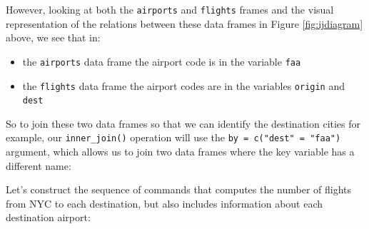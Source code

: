 \documentclass[12pt, krantz2,]{krantz}
\makeatletter
\newenvironment{Shaded}{\begin{snugshade}}{\end{snugshade}}
\newcommand{\DataTypeTok}[1]{\textcolor[rgb]{0.27,0.27,0.27}{#1}}
\newcommand{\KeywordTok}[1]{\textcolor[rgb]{0.27,0.27,0.27}{\textbf{#1}}}
\newcommand{\NormalTok}[1]{#1}
\newcommand{\OperatorTok}[1]{\textcolor[rgb]{0.43,0.43,0.43}{\textbf{#1}}}
\newcommand{\StringTok}[1]{\textcolor[rgb]{0.5,0.5,0.5}{#1}}
\providecommand{\tightlist}{%
  \setlength{\itemsep}{0pt}\setlength{\parskip}{0pt}}
\newenvironment{kframe}{%
\medskip{}
\setlength{\fboxsep}{.8em}
 \def\at@end@of@kframe{}%
 \ifinner\ifhmode%
  \def\at@end@of@kframe{\end{minipage}}%
  \begin{minipage}{\columnwidth}%
 \fi\fi%
 \def\FrameCommand##1{\hskip\@totalleftmargin \hskip-\fboxsep
 \colorbox{shadecolor}{##1}\hskip-\fboxsep
     \hskip-\linewidth \hskip-\@totalleftmargin \hskip\columnwidth}%
 \MakeFramed {\advance\hsize-\width
   \@totalleftmargin\z@ \linewidth\hsize
   \@setminipage}}%
 {\par\unskip\endMakeFramed%
 \at@end@of@kframe}
\renewenvironment{Shaded}{\begin{kframe}}{\end{kframe}}
\makeatother
\begin{document}
However, looking at both the \texttt{airports} and \texttt{flights} frames and the visual representation of the relations between these data frames in Figure \ref{fig:ijdiagram} above, we see that in:

\begin{itemize}
\tightlist
\item
  the \texttt{airports} data frame the airport code is in the variable \texttt{faa}
\item
  the \texttt{flights} data frame the airport codes are in the variables \texttt{origin} and \texttt{dest}
\end{itemize}

So to join these two data frames so that we can identify the destination cities for example, our \texttt{inner\_join()} operation will use the \texttt{by\ =\ c("dest"\ =\ "faa")} argument, which allows us to join two data frames where the key variable has a different name:

\begin{Shaded}
\end{Shaded}

Let's construct the sequence of commands that computes the number of flights from NYC to each destination, but also includes information about each destination airport:

\begin{Shaded}
\end{Shaded}
\end{document}
